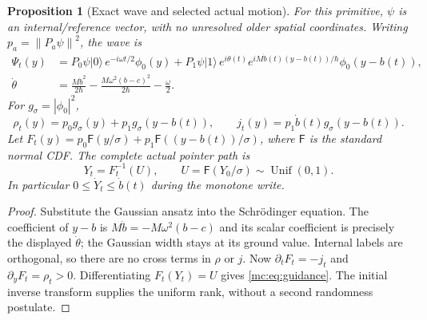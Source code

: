 \documentclass[11pt,oneside,openany]{book}
\newtheorem{proposition}[theorem]{Proposition}
\theoremstyle{definition}
\theoremstyle{remark}\newtheorem{remark}[theorem]{Remark}
\providecommand{\ket}[1]{\lvert#1\rangle}
\providecommand{\norm}[1]{\left\lVert#1\right\rVert}
\providecommand{\mcNcdf}{\mathsf F}
\begin{document}
\begin{proposition}[Exact wave and selected actual motion]\label{mc:prop:writer}
For this primitive, $\psi$ is an internal/reference vector, with no unresolved older spatial coordinates. Writing $p_a=\norm{P_a\psi}^2$, the wave is
\begin{align}\label{mc:eq:packet}
 \Psi_t(y)&=P_0\psi\ket0\,e^{-i\omega t/2}\phi_0(y)
 +P_1\psi\ket1\,e^{i\theta(t)}e^{iM\dot b(t)(y-b(t))/\hbar}\phi_0(y-b(t)),\\
 \dot\theta&=\frac{M\dot b^2}{2\hbar}-\frac{M\omega^2(b-c)^2}{2\hbar}-\frac\omega2.\nonumber
\end{align}
For $g_\sigma=|\phi_0|^2$,
\begin{equation}\label{mc:eq:mixture}
 \rho_t(y)=p_0g_\sigma(y)+p_1g_\sigma(y-b(t)),\qquad
 j_t(y)=p_1\dot b(t)g_\sigma(y-b(t)).
\end{equation}
Let $F_t(y)=p_0\mcNcdf(y/\sigma)+p_1\mcNcdf((y-b(t))/\sigma)$, where $\mcNcdf$ is the standard normal CDF. The complete actual pointer path is
\begin{equation}\label{mc:eq:quantile}
 Y_t=F_t^{-1}(U),\qquad U=\mcNcdf(Y_0/\sigma)\sim\operatorname{Unif}(0,1).
\end{equation}
In particular $0\le\dot Y_t\le\dot b(t)$ during the monotone write.
\end{proposition}
\begin{proof}
Substitute the Gaussian ansatz into the Schr\"odinger equation. The coefficient of $y-b$ is $M\ddot b=-M\omega^2(b-c)$ and its scalar coefficient is precisely the displayed $\dot\theta$; the Gaussian width stays at its ground value. Internal labels are orthogonal, so there are no cross terms in $\rho$ or $j$. Now $\partial_tF_t=-j_t$ and $\partial_yF_t=\rho_t>0$. Differentiating $F_t(Y_t)=U$ gives \eqref{mc:eq:guidance}. The initial inverse transform supplies the uniform rank, without a second randomness postulate.
\end{proof}
\end{document}
